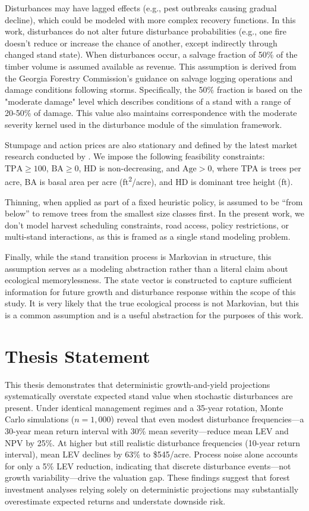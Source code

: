 \documentclass[12pt]{report}
\begin{document}
Disturbances may have lagged effects (e.g., pest outbreaks causing gradual decline), which could be modeled with more complex recovery functions. In this work, disturbances do not alter future disturbance probabilities (e.g., one fire doesn’t reduce or increase the chance of another, except indirectly through changed stand state). When disturbances occur, a salvage fraction of 50\% of the timber volume is assumed available as revenue. This assumption is derived from the Georgia Forestry Commission's guidance on salvage logging operations \parencite{gfc_helene_recovery} and damage conditions following storms. Specifically, the 50\% fraction is based on the "moderate damage" level which describes conditions of a stand with a range of 20-50\% of damage. This value also maintains correspondence with the moderate severity kernel used in the disturbance module of the simulation framework.

Stumpage and action prices are also stationary and defined by the latest market research conducted by \textcite{costsMaggardNatzke}. We impose the following feasibility constraints: $\text{TPA} \geq 100$, $\text{BA} \geq 0$, $\text{HD}$ is non-decreasing, and $\text{Age} > 0$, where TPA is trees per acre, BA is basal area per acre (ft\textsuperscript{2}/acre), and HD is dominant tree height (ft).

Thinning, when applied as part of a fixed heuristic policy, is assumed to be ``from below'' to remove trees from the smallest size classes first. In the present work, we don’t model harvest scheduling constraints, road access, policy restrictions, or multi-stand interactions, as this is framed as a single stand modeling problem.

Finally, while the stand transition process is Markovian in structure, this assumption serves as a modeling abstraction rather than a literal claim about ecological memorylessness. The state vector is constructed to capture sufficient information for future growth and disturbance response within the scope of this study. It is very likely that the true ecological process is not Markovian, but this is a common assumption and is a useful abstraction for the purposes of this work.

\section{Thesis Statement}
This thesis demonstrates that deterministic growth-and-yield projections systematically overstate expected stand value when stochastic disturbances are present. Under identical management regimes and a 35-year rotation, Monte Carlo simulations ($n=1{,}000$) reveal that even modest disturbance frequencies---a 30-year mean return interval with 30\% mean severity---reduce mean LEV and NPV by 25\%. At higher but still realistic disturbance frequencies (10-year return interval), mean LEV declines by 63\% to \$545/acre. Process noise alone accounts for only a 5\% LEV reduction, indicating that discrete disturbance events---not growth variability---drive the valuation gap. These findings suggest that forest investment analyses relying solely on deterministic projections may substantially overestimate expected returns and understate downside risk.
\end{document}
